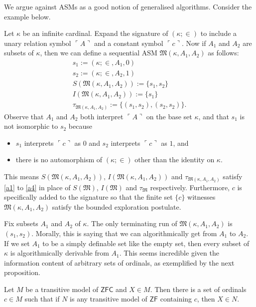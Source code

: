 \documentclass[12pt]{article}
\numberwithin{equation}{section}
\begin{document}
We argue against ASMs as a good notion of generalised algorithms. Consider the example below.

\begin{ex}\label{ex21}
Let $\kappa$ be an infinite cardinal. Expand the signature of $(\kappa; \in)$ to include a unary relation symbol $\ulcorner A \urcorner$ and a constant symbol $\ulcorner c \urcorner$. Now if $A_1$ and $A_2$ are subsets of $\kappa$, then we can define a sequential ASM $\mathfrak{M}(\kappa, A_1, A_2)$ as follows:
\begin{gather*}
    s_1 := (\kappa; \in, A_1, 0) \\
    s_2 := (\kappa; \in, A_2, 1) \\
    S(\mathfrak{M}(\kappa, A_1, A_2)) := \{s_1, s_2\} \\
    I(\mathfrak{M}(\kappa, A_1, A_2)) := \{s_1\} \\
    \tau_{\mathfrak{M}(\kappa, A_1, A_2)} := \{(s_1, s_2), (s_2, s_2)\} \text{.}
\end{gather*}
Observe that $A_1$ and $A_2$ both interpret $\ulcorner A \urcorner$ on the base set $\kappa$, and that $s_1$ is not isomorphic to $s_2$ because 
\begin{itemize}
    \item $s_1$ interprets $\ulcorner c \urcorner$ as $0$ and $s_2$ interprets $\ulcorner c \urcorner$ as $1$, and
    \item there is no automorphism of $(\kappa; \in)$ other than the identity on $\kappa$.
\end{itemize}
This means $S(\mathfrak{M}(\kappa, A_1, A_2))$, $I(\mathfrak{M}(\kappa, A_1, A_2))$ and $\tau_{\mathfrak{M}(\kappa, A_1, A_2)}$ satisfy \ref{a1} to \ref{a4} in place of $S(\mathfrak{M})$, $I(\mathfrak{M})$ and $\tau_{\mathfrak{M}}$ respectively. Furthermore, $c$ is specifically added to the signature so that the finite set $\{c\}$ witnesses $\mathfrak{M}(\kappa, A_1, A_2)$ satisfy the bounded exploration postulate.
\end{ex}

Fix subsets $A_1$ and $A_2$ of $\kappa$. The only terminating run of $\mathfrak{M}(\kappa, A_1, A_2)$ is $(s_1, s_2)$. Morally, this is saying that we can algorithmically get from $A_1$ to $A_2$. If we set $A_1$ to be a simply definable set like the empty set, then every subset of $\kappa$ is algorithmically derivable from $A_1$. This seems incredible given the information content of arbitrary sets of ordinals, as exemplified by the next proposition.

\begin{prop}\label{prop22}
Let $M$ be a transitive model of $\mathsf{ZFC}$ and $X \in M$. Then there is a set of ordinals $c \in M$ such that if $N$ is any transitive model of $\mathsf{ZF}$ containing $c$, then $X \in N$. 
\end{prop}
\end{document}
